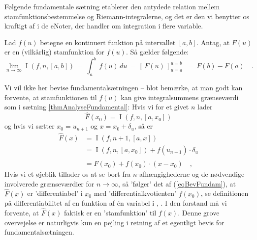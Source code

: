 Følgende fundamentale sætning etablerer den antydede relation mellem stamfunktionsbestemmelse og Riemann-integralerne, og det er den vi benytter os kraftigt af i de eNo\-ter, der handler om integration i flere variable.

\begin{theorem}\label{thmAnalyseFundamental}
Lad $f(u)$ betegne en kontinuert funktion på intervallet $[a, b]$. Antag, at $F(u)$ er en (vilkårlig) stamfunktion for $f(u)$.
Så gælder følgende:
\begin{equation}
\lim_{n \to \infty} \operatorname{I}(f,n, [a, b]) \, = \, \int_{a}^{b}\,f(u) \,du \, = \, [\, F(u)\, ]_{u=a}^{u=b}\,\,\, = \, F(b) - F(a) \quad .
\end{equation}
\end{theorem}

\begin{aha}
Vi vil ikke her bevise fundamentalsætningen -- blot bemærke, at man godt kan forvente, at stamfunktionen til $f(u)$ kan
give integralsummens grænseværdi som i sætning \ref{thmAnalyseFundamental}: Hvis vi for et givet $n$ lader
\begin{equation}
\widehat{F}(x_{0}) = \operatorname{I}(f,n, [a, x_{0}])
\end{equation}
og hvis vi sætter $x_{0} = u_{n+1}$ og $x = x_{0} + \delta_{u}$, så er
\begin{equation} \label{eqBevFundam}
\begin{aligned}
\widehat{F}(x) &= \operatorname{I}(f,n+1, [a, x]) \\
&=  \operatorname{I}(f,n, [a, x_{0}]) + f(u_{n+1}) \cdot \delta_{u} \\
&= \widehat{F}(x_{0}) + f(x_{0}) \cdot (x-x_{0}) \quad ,
\end{aligned}
\end{equation}
Hvis vi et øjeblik tillader os at se bort fra $n$-afhængighederne og de nødvendige involverede grænseværdier for $n \to \infty$, så 'følger' det af (\ref{eqBevFundam}), at $\widehat{F}(x)$ er 'dif\-fe\-ren\-tiabel' i
$x_{0}$ med 'differentialkvotienten' $f(x_{0})$, se definitionen på differentiabilitet af en funktion af \'{e}n variabel i ,  . I den forstand må vi forvente, at  $\widehat{F}(x)$ faktisk er en 'stamfunktion' til $f(x)$. Denne grove overvejelse er naturligvis kun en pejling i retning af et egentligt bevis for fundamentalsætningen.
\end{aha}


